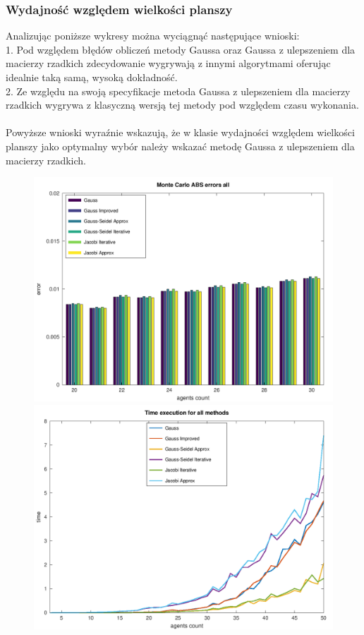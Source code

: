 \documentclass[10pt]{article}
\begin{document}
\subsubsection{Wydajność względem wielkości planszy}
Analizując poniższe wykresy można wyciągnąć następujące wnioski:\\
1. Pod względem błędów obliczeń metody Gaussa oraz Gaussa z ulepszeniem dla macierzy rzadkich zdecydowanie wygrywają z innymi algorytmami oferując idealnie taką samą, wysoką dokładność.\\
2. Ze względu na swoją specyfikacje metoda Gaussa z ulepszeniem dla macierzy rzadkich wygrywa z klasyczną wersją tej metody pod względem czasu wykonania.\\
\\
Powyższe wnioski wyraźnie wskazują, że w klasie wydajności względem wielkości planszy jako optymalny wybór należy wskazać metodę Gaussa z ulepszeniem dla macierzy rzadkich.
\begin{figure}[h]
\centering
\includegraphics[scale=0.45]{plots/01_abs_all_methods_all_rows.png}
\includegraphics[scale=0.45]{plots/02_time_execution_all_methods.png}
\end{figure}
\newpage
\end{document}
